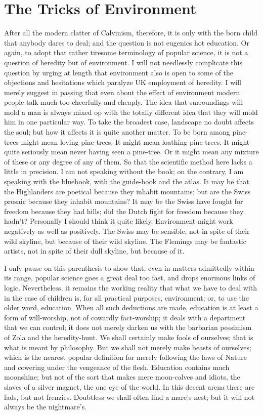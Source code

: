 \documentclass{book}
\begin{document}
\chapter{The Tricks of Environment}
\label{chapter-34}
After all the modern clatter of Calvinism, therefore, it is only with the born child that anybody dares to deal; and the question is not eugenics hot education. Or again, to adopt that rather tiresome terminology of popular science, it is not a question of heredity but of environment. I will not needlessly complicate this question by urging at length that environment also is open to some of the objections and hesitations which paralyze UK employment of heredity. I will merely suggest in passing that even about the effect of environment modern people talk much too cheerfully and cheaply. The idea that surroundings will mold a man is always mixed op with the totally different idea that they will mold him in one particular way. To take the broadest case, landscape no doubt affects the soul; but how it affects it is quite another matter. To be born among pine-trees might mean loving pine-trees. It might mean loathing pine-trees. It might quite seriously mean never having seen a pine-tree. Or it might mean any mixture of these or any degree of any of them. So that the scientific method here lacks a little in precision. I am not speaking without the book; on the contrary, I am speaking with the bluebook, with the guide-book and the atlas. It may be that the Highlanders are poetical because they inhabit mountains; but are the Swiss prosaic because they inhabit mountains? It may be the Swiss have fought for freedom because they had hills; did the Dutch fight for freedom because they hadn’t? Personally I should think it quite likely. Environment might work negatively as well as positively. The Swiss may be sensible, not in spite of their wild skyline, but because of their wild skyline. The Flemings may be fantastic artists, not in spite of their dull skyline, but because of it.

I only pause on this parenthesis to show that, even in matters admittedly within its range, popular science goes a great deal too fast, and drops enormous links of logic. Nevertheless, it remains the working reality that what we have to deal with in the case of children is, for all practical purposes, environment; or, to use the older word, education. When all such deductions are made, education is at least a form of will-worship, not of cowardly fact-worship; it deals with a department that we can control; it does not merely darken us with the barbarian pessimism of Zola and the heredity-hunt. We shall certainly make fools of ourselves; that is what is meant by philosophy. But we shall not merely make beasts of ourselves; which is the nearest popular definition for merely following the laws of Nature and cowering under the vengeance of the flesh. Education contains much moonshine; but not of the sort that makes mere moon-calves and idiots, the slaves of a silver magnet, the one eye of the world. In this decent arena there are fads, but not frenzies. Doubtless we shall often find a mare’s nest; but it will not always be the nightmare’s.
\end{document}
